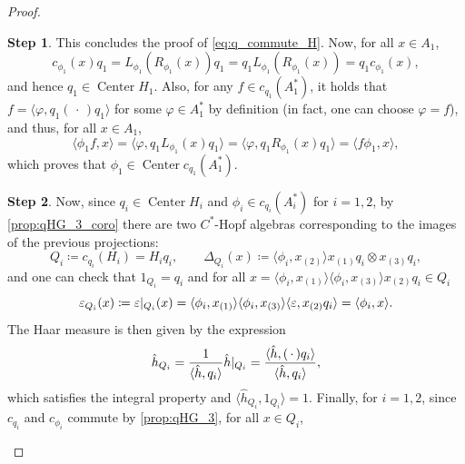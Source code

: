 \documentclass[a4paper,10pt]{amsart}
\newcommand{\eval}[2]{\langle #1 , #2\rangle}
\newcommand{\placeholder}{\,\cdot\,}
\theoremstyle{definition}
\newtheorem{step-goursat}{Step}
\begin{document}
\begin{proof}
\begin{step-goursat}
    This concludes the proof of \cref{eq:q_commute_H}.
    Now, for all $x\in A_1$,
    \[
        c_{\phi_1}(x) q_1 = L_{\phi_1}(R_{\phi_1}(x)) q_1 = q_1 L_{\phi_1}(R_{\phi_1}(x))  = q_1  c_{\phi_1}(x),
    \]
    and hence $q_1\in\operatorname{Center} H_1$. Also, for any $f\in c_{q_1}(A_1^*)$, it holds that $f = \eval{\varphi}{q_1(\placeholder)q_1}$ for some $\varphi\in A_1^*$ by definition (in fact, one can choose $\varphi = f$), and thus, for all $x\in A_1$,
    \[
        \eval{\phi_1 f}{x}
        =
        \eval{\varphi}{q_1 L_{\phi_1}(x) q_1}
        =
        \eval{\varphi}{q_1 R_{\phi_1}(x) q_1}
        =
        \eval{f \phi_1}{x},
    \]
    which proves that $\phi_1\in \operatorname{Center}c_{q_1}(A_1^*)$.
    \end{step-goursat}
    \begin{step-goursat}
    Now, since $q_i\in \operatorname{Center}H_i$ and $\phi_i \in c_{q_i}(A_i^*)$ for $i=1,2$, by \cref{prop:qHG_3_coro} there are two $C^*$-Hopf algebras corresponding to the images of the previous projections:
    \begin{equation}
        Q_i
            \coloneqq
            c_{q_i}(H_i)=H_i q_i,
        \qquad
        \Delta_{Q_i}(x) \coloneqq
            \eval{\phi_i}{x_{(2)}} x_{(1)}q_i \otimes x_{(3)} q_i,
    \end{equation}
    and one can check that $1_{Q_i}=q_i$ and for all $x = \eval{\phi_i}{x_{(1)}}\eval{\phi_i}{x_{(3)}}x_{(2)} q_i\in Q_i$
    \begin{equation}
        \varepsilon_{Q_i}(x)
        \coloneqq
        \varepsilon|_{\smash{Q_i}}(x)
        =
        \eval{\phi_i}{x_{(1)}}
            \eval{\phi_i}{x_{(3)}}
                \eval{\varepsilon}{x_{(2)} q_i}
        =
        \eval{\phi_i}{x}.
    \end{equation}
    The Haar measure is then given  by the expression 
    \begin{equation} \label{eq:hathQiexpression}
        \hat{h}_{Q_i}
        =
        \frac{1}{\eval{\hat{h}}{q_i}}\hat{h}|_{\smash{Q_i}}
        =
        \frac{\eval{\hat{h}}{(\placeholder) q_i}}{\eval{\hat{h}}{q_i}},
    \end{equation}
    which satisfies the integral property and $\eval{\hat{h}_{Q_i}}{1_{Q_i}}=1$.
    \smallbreak\noindent%
    Finally, for $i=1, 2$, 
    since $c_{q_i}$ and $c_{\phi_i}$ commute by \cref{prop:qHG_3}, for all $x\in Q_i$,
    \begin{equation} \label{eq:invQunderProj}

\end{equation}
\end{step-goursat}
\end{proof}
\end{document}
